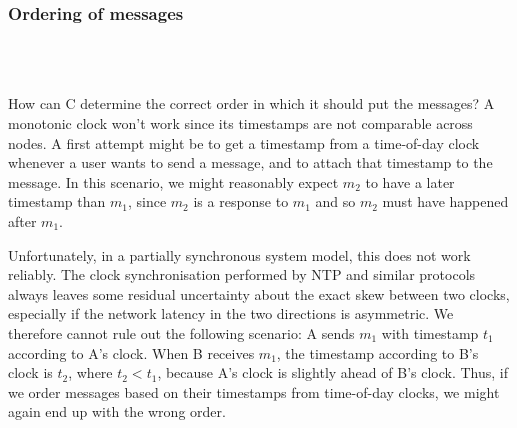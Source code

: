 \begin{frame}
    \label{s:moon-cheese}
    \frametitle{Ordering of messages}
    \begin{center}
    \end{center}
    \\
    \\[1em]%
\end{frame}
\label{l:moon-cheese}

How can C determine the correct order in which it should put the messages?
A monotonic clock won't work since its timestamps are not comparable across nodes.
A first attempt might be to get a timestamp from a time-of-day clock whenever a user wants to send a message, and to attach that timestamp to the message.
In this scenario, we might reasonably expect $m_2$ to have a later timestamp than $m_1$, since $m_2$ is a response to $m_1$ and so $m_2$ must have happened after $m_1$.

Unfortunately, in a partially synchronous system model, this does not work reliably.
The clock synchronisation performed by NTP and similar protocols always leaves some residual uncertainty about the exact skew between two clocks, especially if the network latency in the two directions is asymmetric.
We therefore cannot rule out the following scenario: A sends $m_1$ with timestamp $t_1$ according to A's clock.
When B receives $m_1$, the timestamp according to B's clock is $t_2$, where $t_2 < t_1$, because A's clock is slightly ahead of B's clock.
Thus, if we order messages based on their timestamps from time-of-day clocks, we might again end up with the wrong order.

